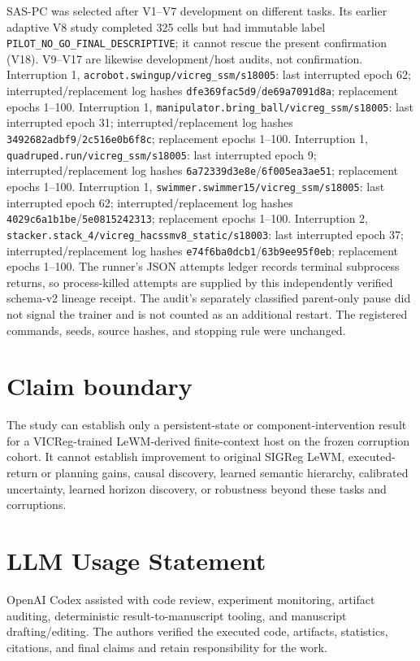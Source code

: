 SAS-PC was selected after V1--V7 development on different tasks. Its
earlier adaptive V8 study completed 325 cells but had immutable label
\texttt{PILOT\_NO\_GO\_FINAL\_DESCRIPTIVE}; it cannot rescue the present
confirmation (V18). V9--V17 are likewise development/host audits, not
confirmation. Interruption 1,
\texttt{acrobot.swingup/vicreg\_ssm/s18005}: last interrupted epoch 62;
interrupted/replacement log hashes
\texttt{dfe369fac5d9}/\texttt{de69a7091d8a}; replacement epochs 1--100.
Interruption 1, \texttt{manipulator.bring\_ball/vicreg\_ssm/s18005}:
last interrupted epoch 31; interrupted/replacement log hashes
\texttt{3492682adbf9}/\texttt{2c516e0b6f8c}; replacement epochs 1--100.
Interruption 1, \texttt{quadruped.run/vicreg\_ssm/s18005}: last
interrupted epoch 9; interrupted/replacement log hashes
\texttt{6a72339d3e8e}/\texttt{6f005ea3ae51}; replacement epochs 1--100.
Interruption 1, \texttt{swimmer.swimmer15/vicreg\_ssm/s18005}: last
interrupted epoch 62; interrupted/replacement log hashes
\texttt{4029c6a1b1be}/\texttt{5e0815242313}; replacement epochs 1--100.
Interruption 2,
\texttt{stacker.stack\_4/vicreg\_hacssmv8\_static/s18003}: last
interrupted epoch 37; interrupted/replacement log hashes
\texttt{e74f6ba0dcb1}/\texttt{63b9ee95f0eb}; replacement epochs 1--100.
The runner's JSON attempts ledger records terminal subprocess returns,
so process-killed attempts are supplied by this independently verified
schema-v2 lineage receipt. The audit's separately classified parent-only
pause did not signal the trainer and is not counted as an additional
restart. The registered commands, seeds, source hashes, and stopping
rule were unchanged.

\section{Claim boundary}\label{claim-boundary}

The study can establish only a persistent-state or
component-intervention result for a VICReg-trained LeWM-derived
finite-context host on the frozen corruption cohort. It cannot establish
improvement to original SIGReg LeWM, executed-return or planning gains,
causal discovery, learned semantic hierarchy, calibrated uncertainty,
learned horizon discovery, or robustness beyond these tasks and
corruptions.

\section{LLM Usage Statement}\label{llm-usage-statement}

OpenAI Codex assisted with code review, experiment monitoring, artifact
auditing, deterministic result-to-manuscript tooling, and manuscript
drafting/editing. The authors verified the executed code, artifacts,
statistics, citations, and final claims and retain responsibility for
the work.
